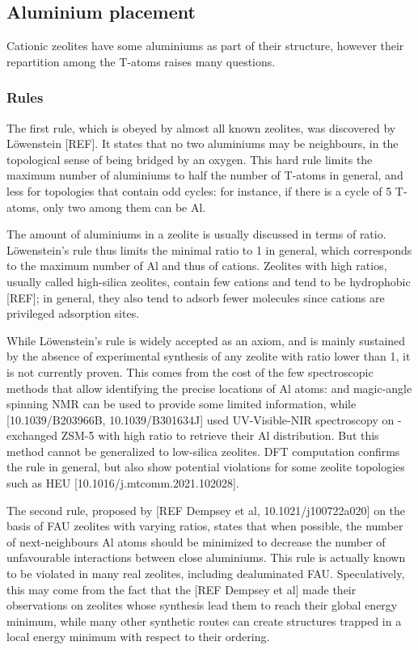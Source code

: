 \documentclass[main.tex]{subfiles}
\begin{document}
\subsection{Aluminium placement}

Cationic zeolites have some aluminiums as part of their structure, however their repartition among the T-atoms raises many questions.

\subsubsection{Rules}

The first rule, which is obeyed by almost all known zeolites, was discovered by L\"owenstein [REF]. It states that no two aluminiums may be neighbours, in the topological sense of being bridged by an oxygen. This hard rule limits the maximum number of aluminiums to half the number of T-atoms in general, and less for topologies that contain odd cycles: for instance, if there is a cycle of 5 T-atoms, only two among them can be Al.

The amount of aluminiums in a zeolite is usually discussed in terms of \SiAl ratio. L\"owenstein's rule thus limits the minimal \SiAl ratio to 1 in general, which corresponds to the maximum number of Al and thus of cations. Zeolites with high \SiAl ratios, usually called high-silica zeolites, contain few cations and tend to be hydrophobic [REF]; in general, they also tend to adsorb fewer molecules since cations are privileged adsorption sites.

While L\"owenstein's rule is widely accepted as an axiom, and is mainly sustained by the absence of experimental synthesis of any zeolite with \SiAl ratio lower than 1, it is not currently proven. This comes from the cost of the few spectroscopic methods that allow identifying the precise locations of Al atoms:  and  magic-angle spinning NMR can be used to provide some limited information, while [10.1039/B203966B, 10.1039/B301634J] used UV-Visible-NIR spectroscopy on -exchanged ZSM-5 with high \SiAl ratio to retrieve their Al distribution. But this method cannot be generalized to low-silica zeolites. DFT computation confirms the rule in general, but also show potential violations for some zeolite topologies such as HEU [10.1016/j.mtcomm.2021.102028].

The second rule, proposed by [REF Dempsey et al, 10.1021/j100722a020] on the basis of FAU zeolites with varying \SiAl ratios, states that when possible, the number of next-neighbours Al atoms should be minimized to decrease the number of unfavourable interactions between close aluminiums. This rule is actually known to be violated in many real zeolites, including dealuminated FAU. Speculatively, this may come from the fact that the [REF Dempsey et al] made their observations on zeolites whose synthesis lead them to reach their global energy minimum, while many other synthetic routes can create structures trapped in a local energy minimum with respect to their \SiAl ordering.
\end{document}
